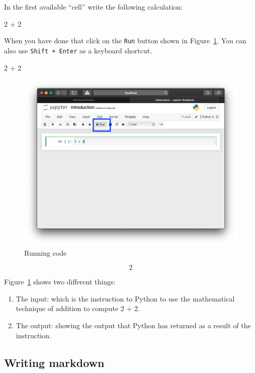 In the first available ``cell'' write the following calculation:

\begin{api}
    2 + 2
\end{api}


When you have done that click on the \texttt{Run} button shown in
Figure~\ref{fig:running_code}. You can also use
\texttt{Shift + Enter} as a keyboard shortcut.

\begin{pyin}
    2 + 2
\end{pyin}

\begin{figure}[htbp]
\centering
    \includegraphics[width=0.750\linewidth]{assets/running_code/main.png}
    \caption{Running code}\label{fig:running_code}
\end{figure}

\[2\]


Figure~\ref{fig:running_code} shows two different things:

\begin{enumerate}
\item 

The input: which is the instruction to Python to use the
mathematical technique of addition to compute 2 + 2.

\item 

The output: showing the output that Python has returned as a result
of the instruction.

\end{enumerate}


\subsection{Writing markdown}

